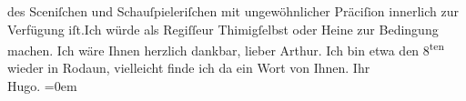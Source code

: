 \begin{ledgroupsized}[t]{13cm}
               des Sceniſchen und Schauſpieleriſchen mit ungewöhnlicher Präciſion innerlich zur
               Verfügung iſt.\hspace*{1.5em}Ich würde als Regiſſeur Thimigſelbst oder Heine zur Bedingung machen.\pend
           \pstart
           Ich wäre Ihnen herzlich dankbar, lieber Arthur. Ich bin etwa den 8\textsuperscript{ten} wieder in Rodaun, vielleicht finde ich da
               ein Wort von Ihnen.\pend
           \pstart
           Ihr{\\[\baselineskip]}\spacefill\mbox{Hugo.}\pend
           \leftskip=0em{}          \endnumbering{}\end{ledgroupsized}  \newcommand{\dateiname}{L02112}\newcommand{\titel}{Hugo von Hofmannsthal an Arthur Schnitzler, 3. 1. 1913}\newcommand{\editorInnen}{Martin Anton Müller und Gerd-Hermann Susen}
            \footnotesize
\begin{ledgroupsized}[t]{11.5cm}
\end{ledgroupsized}
         
      
